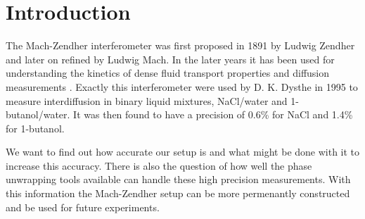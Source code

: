 \section {Introduction}
  The Mach-Zendher interferometer was first proposed in 1891 by Ludwig Zendher
  \cite{lz} and later on refined by Ludwig Mach\cite{lm}.
  In the later years it has been used for understanding the kinetics of dense
  fluid transport properties\cite{th,dym} and diffusion measurements \cite{dag}.
  Exactly this interferometer were used by D. K. Dysthe in 1995 to measure interdiffusion
  in binary liquid mixtures, NaCl/water and 1-butanol/water. It was then found to 
  have a precision of 0.6\% for NaCl and 1.4\% for 1-butanol\cite{dag}.

  We want to find out how accurate our setup is and what might be
  done with it to increase this accuracy. There is also the question of how well
  the phase unwrapping tools available can handle these high precision measurements.
  With this information the Mach-Zendher setup can be more permenantly constructed 
  and be used for future experiments.
  
